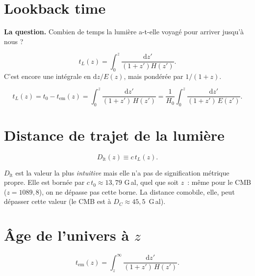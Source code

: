 \documentclass[11pt,a4paper,openany]{report}
\newcommand{\dif}{\mathrm{d}}
\newcommand{\Hzero}{H_{0}}
\begin{document}
\section{Lookback time}

\begin{tcolorbox}[vulgarisation]
\textbf{La question.} Combien de temps la lumière a-t-elle voyagé pour
arriver jusqu'à nous ?
\end{tcolorbox}

\begin{tcolorbox}[mathspe]
\[
t_L(z) = \int_{0}^{z}\frac{\dif z'}{(1+z')H(z')}.
\]
C'est encore une intégrale en $\dif z/E(z)$, mais pondérée par $1/(1+z)$.
\end{tcolorbox}

\begin{equation}
t_{L}(z) = t_{0} - t_{\text{em}}(z) = \int_{0}^{z}\frac{\dif z'}{(1+z')\,H(z')}
        = \frac{1}{\Hzero}\int_{0}^{z}\frac{\dif z'}{(1+z')\,E(z')}.
\label{eq:tlookback}
\end{equation}

\section{Distance de trajet de la lumière}

\begin{equation}
D_{\text{lt}}(z) \equiv c\,t_{L}(z).
\label{eq:Dlt}
\end{equation}

\begin{tcolorbox}[attention]
$D_{\text{lt}}$ est la valeur la plus \emph{intuitive} mais elle n'a pas de
signification métrique propre. Elle est bornée par $c\,t_{0}\approx 13{,}79$
G\,al, quel que soit $z$~: même pour le CMB ($z=1089{,}8$), on ne dépasse pas
cette borne. La distance comobile, elle, peut dépasser cette valeur
(le CMB est à $D_C \approx 45{,}5$~G\,al).
\end{tcolorbox}

\section{Âge de l'univers à $z$}

\begin{equation}
t_{\text{em}}(z) = \int_{z}^{\infty}\frac{\dif z'}{(1+z')\,H(z')}.
\label{eq:t_z}
\end{equation}

\end{document}
